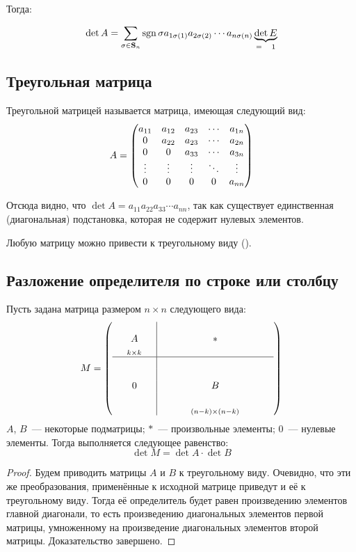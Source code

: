 Тогда:

$$
	\det A
	=\sum_{\sigma\in\mathbf{S}_n}
	\operatorname{sgn}\sigma
	a_{1\sigma(1)}a_{2\sigma(2)}\cdots a_{n\sigma(n)}
	\underbrace{\det E}_{=\quad1}
$$

\subsection{Треугольная матрица}

\label{matrixdet:triangular}

Треугольной матрицей называется матрица, имеющая следующий вид:
$$ A = \begin{pmatrix}
a_{11} & a_{12} & a_{23} & \cdots & a_{1n} \\
0      & a_{22} & a_{23} & \cdots & a_{2n} \\
0      & 0      & a_{33} & \cdots & a_{3n} \\
\vdots & \vdots & \vdots & \ddots & \vdots \\
0      & 0      & 0      & 0      & a_{nn}
\end{pmatrix}
$$

Отсюда видно, что $\det A = a_{11} a_{22} a_{33} \cdots a_{nn}$, так как
существует единственная (диагональная) подстановка, которая не содержит
нулевых элементов.

Любую матрицу можно привести к треугольному виду ({}).

\subsection{Разложение определителя по строке или столбцу}

\label{matrixdet:rowexpansion}

\begin{lemma}
	\label{matrixdet:blocklemma}
	Пусть задана матрица размером $n\times n$ следующего вида:
	$$
	M =
	\left(
	\begin{array}{rcl|rrrclll}
		& &  &  &&& &&& \\
		&A&  &  &&&*&&& \\
		&_{k \times k}&  &  &&& &&& \\
		\hline
		& &  &  &&& &&& \\
		& &  &  &&& &&& \\
		&0&  &  &&&B&&& \\
		& &  &  &&& &&& \\
		& &  &  &&&_{(n-k)\times(n-k)}&&&
	\end{array}
	\right)
	$$
	$A$, $B$~--- некоторые подматрицы; $*$~--- произвольные элементы; $0$~--- нулевые элементы. Тогда выполняется следующее равенство:
	$$ \det M = \det A \cdot \det B $$
\end{lemma}
\begin{proof}
  Будем приводить матрицы $A$ и $B$ к треугольному виду. Очевидно, что эти же преобразования, применённые к исходной матрице приведут и её к треугольному виду. Тогда её определитель будет равен произведению элементов главной диагонали, то есть произведению диагональных элементов первой матрицы, умноженному на произведение диагональных элементов второй матрицы. Доказательство завершено.
\end{proof}

